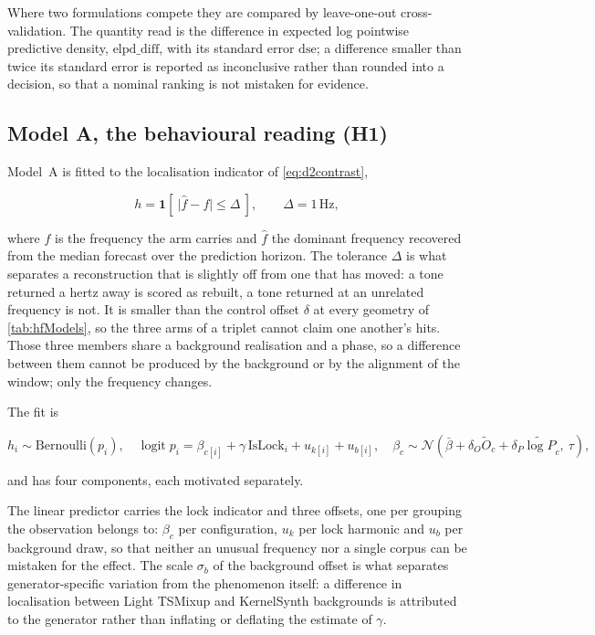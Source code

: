 Where two formulations compete they are compared by leave-one-out cross-validation. The quantity read is the difference in expected log pointwise predictive density, $\mathrm{elpd\_diff}$, with its standard error $\mathrm{dse}$; a difference smaller than twice its standard error is reported as inconclusive rather than rounded into a decision, so that a nominal ranking is not mistaken for evidence.

\subsection{Model A, the behavioural reading (H1)}

Model~A is fitted to the localisation indicator of \autoref{eq:d2contrast},

\begin{equation}
\label{eq:appA:contrast}
h = \mathbf{1}\!\left[\ \bigl|\hat f - f\bigr| \le \Delta\ \right],
\qquad
\Delta = 1\,\mathrm{Hz},
\end{equation}

where $f$ is the frequency the arm carries and $\hat f$ the dominant frequency recovered from the median forecast over the prediction horizon. The tolerance $\Delta$ is what separates a reconstruction that is slightly off from one that has moved: a tone returned a hertz away is scored as rebuilt, a tone returned at an unrelated frequency is not. It is smaller than the control offset $\delta$ at every geometry of \autoref{tab:hfModels}, so the three arms of a triplet cannot claim one another's hits. Those three members share a background realisation and a phase, so a difference between them cannot be produced by the background or by the alignment of the window; only the frequency changes.

The fit is

\begin{equation}
\label{eq:appA:model}
h_i \sim \mathrm{Bernoulli}(p_i),
\quad
\operatorname{logit} p_i = \beta_{c[i]} + \gamma\,\mathrm{IsLock}_i + u_{k[i]} + u_{b[i]},
\quad
\beta_c \sim \mathcal{N}\!\left(\bar\beta + \delta_O \widetilde O_c + \delta_P \widetilde{\log P}_c,\ \tau\right),
\end{equation}

and has four components, each motivated separately.

The linear predictor carries the lock indicator and three offsets, one per grouping the observation belongs to: $\beta_c$ per configuration, $u_k$ per lock harmonic and $u_b$ per background draw, so that neither an unusual frequency nor a single corpus can be mistaken for the effect. The scale $\sigma_b$ of the background offset is what separates generator-specific variation from the phenomenon itself: a difference in localisation between Light TSMixup and KernelSynth backgrounds is attributed to the generator rather than inflating or deflating the estimate of $\gamma$.

